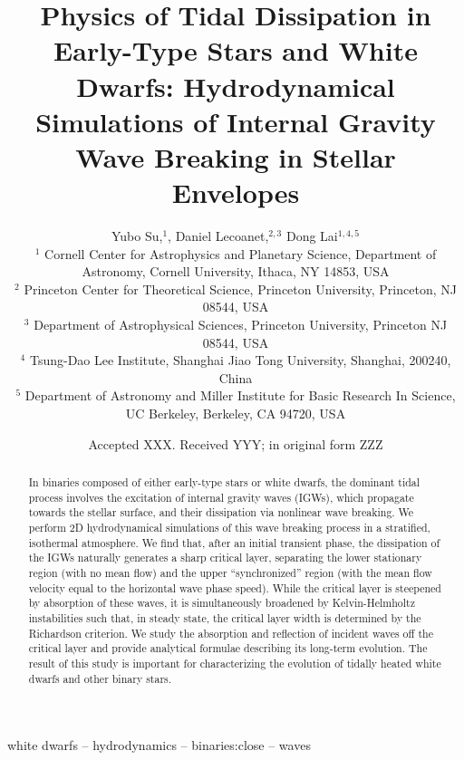 \documentclass[
        fleqn,
        usenatbib,
    ]{mnras}
\title[Physics of Tidal Dissipation]{Physics of Tidal Dissipation in Early-Type
Stars and White Dwarfs: Hydrodynamical Simulations of Internal Gravity Wave
Breaking in Stellar Envelopes}
\author[Y. Su et\ al.]{
Yubo Su,$^1$,
Daniel Lecoanet,$^{2,3}$
Dong Lai$^{1,4, 5}$
\\
$^1$ Cornell Center for Astrophysics and Planetary Science, Department of
Astronomy, Cornell University, Ithaca, NY 14853, USA
\\
$^2$ Princeton Center for Theoretical Science, Princeton University, Princeton,
NJ 08544, USA
\\
$^3$ Department of Astrophysical Sciences, Princeton University, Princeton NJ
08544, USA
\\
$^4$ Tsung-Dao Lee Institute, Shanghai Jiao Tong University, Shanghai, 200240,
China
\\
$^5$ Department of Astronomy and Miller Institute for Basic Research In Science,
UC Berkeley, Berkeley, CA 94720, USA
}
\date{Accepted XXX\@. Received YYY\@; in original form ZZZ}
\begin{document}
\label{firstpage}
\pagerange{\pageref{firstpage}--\pageref{lastpage}}
\maketitle


\begin{abstract}
    In binaries composed of \textcolor{Corr}{either early-type stars or white
    dwarfs}, the dominant tidal process involves the excitation of internal
    gravity waves (IGWs), which propagate towards the stellar surface, and their
    dissipation via nonlinear wave breaking. We perform 2D hydrodynamical
    simulations of this wave breaking process in a stratified, isothermal
    atmosphere. We find that, after an initial transient phase, the dissipation
    of the IGWs naturally generates a sharp critical layer, separating the lower
    stationary region (with no mean flow) and the upper ``synchronized'' region
    (with the mean flow velocity equal to the horizontal wave phase speed).
    While the critical layer is steepened by absorption of these waves, it is
    simultaneously broadened by Kelvin-Helmholtz instabilities such that, in
    steady state, the critical layer width is determined by the Richardson
    criterion. We study the absorption and reflection of incident waves off the
    critical layer and provide analytical formulae describing its long-term
    evolution. The result of this study is important for characterizing the
    evolution of tidally heated white dwarfs and other binary stars.
\end{abstract}

\begin{keywords}
white dwarfs -- hydrodynamics -- binaries:close -- waves %
\end{keywords}
\end{document}

